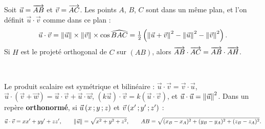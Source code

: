 \noindent
\begin{minipage}[c]{0.58\linewidth}
\begin{definition}
\raggedright
Soit $\vec u=\overrightarrow{AB}$ et $\vec v=\overrightarrow{AC}$. Les points $A$, $B$, $C$ sont dans un même plan, et l'on définit $\vec u\cdot\vec v$
comme dans ce plan :
\[\vec u\cdot\vec v=\left\lVert\vec u\right\rVert\times\left\lVert\vec v\right\rVert\times\cos\widehat{BAC}=\tfrac12\left(\left\lVert\vec u+\vec v\right\rVert^2-\left\lVert\vec u\right\rVert^2-\left\lVert\vec v\right\rVert^2\right).\]
Si $H$ est le projeté orthogonal de $C$ sur $(AB)$, alors $\overrightarrow{AB}\cdot\overrightarrow{AC}=\overrightarrow{AB}\cdot\overrightarrow{AH}$.
\end{definition}
\end{minipage}\hfill
\begin{minipage}[c]{0.38\linewidth}
\centering
{}\\[0.5mm]
\end{minipage}

\begin{propriete}
Le produit scalaire est symétrique et bilinéaire : $\vec u\cdot\vec v=\vec v\cdot\vec u$,
$\vec u\cdot(\vec v+\vec w)=\vec u\cdot\vec v+\vec u\cdot\vec w$, $(k\vec u)\cdot\vec v=k(\vec u\cdot\vec v)$, et
$\vec u\cdot\vec u=\left\lVert\vec u\right\rVert^2$. Dans un repère \textbf{orthonormé}, si $\vec u\,(x\,{;}\, y\,{;}\, z)$ et $\vec v\,(x'\,{;}\, y'\,{;}\, z')$ :
\[\vec u\cdot\vec v=xx'+yy'+zz',\qquad \left\lVert\vec u\right\rVert=\sqrt{x^2+y^2+z^2},\qquad
AB=\sqrt{(x_B-x_A)^2+(y_B-y_A)^2+(z_B-z_A)^2}.\]
\end{propriete}


